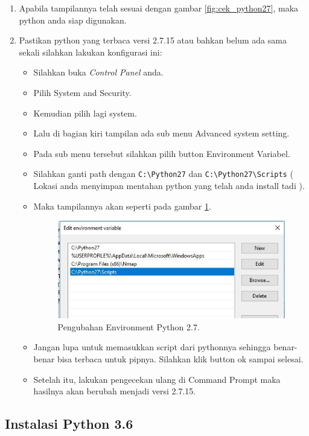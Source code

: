 \begin{enumerate}
\item Apabila tampilannya telah sesuai dengan gambar \ref{fig:cek_python27}, maka python anda siap digunakan.
\item Pastikan python yang terbaca versi 2.7.15 atau bahkan belum ada sama sekali silahkan lakukan konfigurasi ini:
\begin{itemize}
\item Silahkan buka \textit{Control Panel} anda.
\item Pilih System and Security.
\item Kemudian pilih lagi system.
\item Lalu  di  bagian  kiri  tampilan  ada  sub menu  Advanced  system setting.
\item Pada  sub  menu  tersebut  silahkan  pilih  button  Environment Variabel.
\item Silahkan ganti path dengan \verb|C:\Python27| dan \verb|C:\Python27\Scripts| ( Lokasi anda menyimpan mentahan python yang telah anda install tadi ).
\item Maka tampilannya akan seperti pada gambar \ref{fig:editenv}.
\begin{figure}[!htbp]
	\centerline{\includegraphics[width=1\textwidth]{figures/8/editenv.jpg}}
	\caption{Pengubahan Environment Python 2.7.}
	\label{fig:editenv}
\end{figure}

\item Jangan lupa untuk memasukkan script dari pythonnya sehingga benar-benar bisa terbaca untuk pipnya. Silahkan klik button ok sampai selesai.
\item Setelah itu, lakukan pengecekan ulang di Command Prompt maka hasilnya akan berubah menjadi versi 2.7.15.
\end{itemize}
\end{enumerate}

\subsection{Instalasi Python 3.6}

